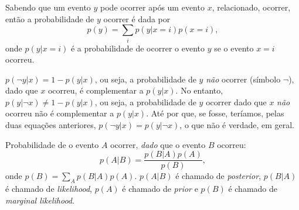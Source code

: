 \documentclass[a4paper,12pt]{article}
\newcommand\foreign[1]{\textsl{#1}}
\begin{document}
	Sabendo que um evento $y$ pode ocorrer após um evento $x$, relacionado, ocorrer, então a probabilidade de $y$ ocorrer é dada por
	\begin{equation*}
	p(y) = \sum_i p(y|x = i)p(x=i),
	\end{equation*}
onde $p(y|x=i)$ é a probabilidade de ocorrer o evento $y$ se o evento $x=i$ ocorreu.

	$p(\neg y|x) = 1 - p(y|x)$, ou seja, a probabilidade de $y$ \emph{não} ocorrer (símbolo $\neg$), dado que $x$ ocorreu, é complementar a $p(y|x)$. No entanto, $p(y|\neg x) \ne 1 - p(y|x)$, ou seja, a probabilidade de $y$ ocorrer dado que $x$ \emph{não} ocorreu não é complementar a $p(y|x)$. Até por que, se fosse, teríamos, pelas duas equações anteriores, $p(\neg y|x) = p(y|\neg x)$, o que não é verdade, em geral.


	Probabilidade de o evento $A$ ocorrer, \emph{dado} que o evento $B$ ocorreu:
	\begin{equation*}
	p(A|B) = \frac{p(B|A)p(A)}{p(B)},
	\end{equation*}
onde $p(B) = \sum_A p(B|A)p(A)$. $p(A|B)$ é chamado de \foreign{posterior}, $p(B|A)$ é chamado de \foreign{likelihood}, $p(A)$ é chamado de \foreign{prior} e $p(B)$ é chamado de \foreign{marginal likelihood}.
\end{document}
